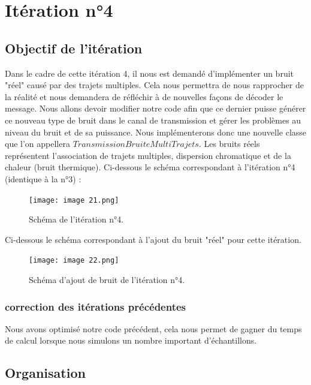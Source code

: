 \section{Itération n°4}

\subsection{Objectif de l'itération}

Dans le cadre de cette itération 4, il nous est demandé d'implémenter un bruit "réel" causé par des trajets multiples. Cela nous permettra de nous rapprocher de la réalité et nous demandera de réfléchir à de nouvelles façons de décoder le message. Nous allons devoir modifier notre code afin que ce dernier puisse générer ce nouveau type de bruit dans le canal de transmission et gérer les problèmes au niveau du bruit et de sa puissance. Nous implémenterons donc une nouvelle classe que l'on appellera $TransmissionBruiteMultiTrajets$. Les bruits réels représentent l'association de trajets multiples, dispersion chromatique et de la chaleur (bruit thermique). 
Ci-dessous le schéma correspondant à l'itération n°4 (identique à la n°3) :

\begin{figure}[H]
\centering
\texttt{[image: image 21.png]}
\caption{\label{fig:image21}Schéma de l'itération n°4.}
\end{figure}

Ci-dessous le schéma correspondant à l'ajout du bruit "réel" pour cette itération.

\begin{figure}[H]
\centering
\texttt{[image: image 22.png]}
\caption{\label{fig:image22}Schéma d'ajout de bruit de l'itération n°4.}
\end{figure}

\subsubsection{correction des itérations précédentes}

Nous avons optimisé notre code précédent, cela nous permet de gagner du temps de calcul lorsque nous simulons un nombre important d'échantillons.  

\subsection{Organisation}


